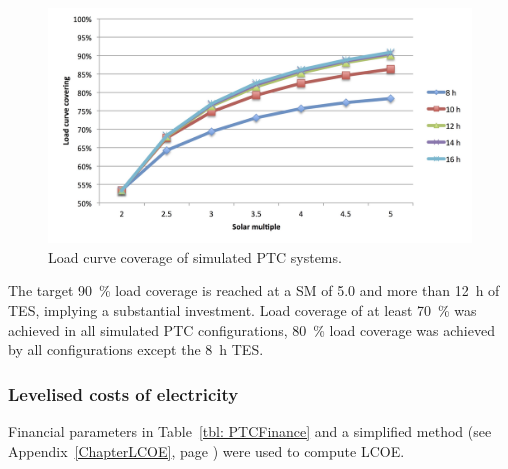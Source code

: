 \begin{figure}[bhtp]  
\centering
\includegraphics[width=1\linewidth]{FIG/PTC_LCCF}
\caption[Load curve coverage of simulated PTC systems.]{Load curve coverage of simulated PTC systems.}\label{PTC_LCCF}
\end{figure}


The target \SI{90}{\percent} load coverage is reached at a SM of \num{5.0} and more than \SI{12}{h} of TES, implying a substantial investment. Load coverage of at least \SI{70}{\percent} was achieved in all simulated PTC configurations,  \SI{80}{\percent} load coverage was achieved by all configurations except the \SI{8}{h} TES.

\subsubsection{Levelised costs of electricity}

Financial parameters in Table~\ref{tbl: PTCFinance} and a simplified method (see Appendix~\ref{ChapterLCOE}, page \pageref{ChapterLCOE}) were used to compute LCOE. 

